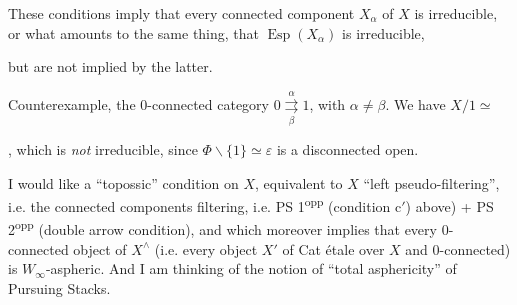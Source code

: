 \documentclass[11pt]{article}
\newcommand{\msp}[1]{\marginpar{\footnotesize [#1]}}
\begin{document}
\noindent These conditions imply that every connected component $X_{\alpha}$ of $X$ is irreducible, or what amounts to the same thing, that $\operatorname{Esp}(X_{\alpha})$ is irreducible,

\msp{page 15}

\noindent but are not implied by the latter.

Counterexample, the 0-connected category $0 \underset{\beta}{\overset{\alpha}{\rightrightarrows}} 1$, with $\alpha \neq \beta$. We have $X/1 \simeq$
, which is \textit{not} irreducible, since $\Phi \backslash \{1\} \simeq \varepsilon$ is a disconnected open.

I would like a ``topossic'' condition on $X$, equivalent to $X$ ``left pseudo-filtering'', i.e. the connected components filtering, i.e. PS 1\textsuperscript{opp} (condition c$'$) above) + PS 2\textsuperscript{opp} (double arrow condition), and which moreover implies that every 0-connected object of $X^{\wedge}$ (i.e. every object $X'$ of Cat étale over $X$ and 0-connected) is $W_{\infty}$-aspheric. And I am thinking of the notion of ``total asphericity'' of Pursuing Stacks.
\end{document}
